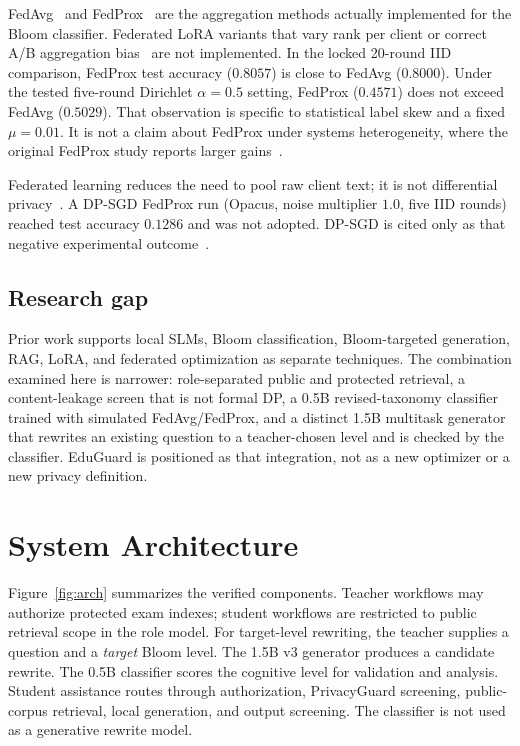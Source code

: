 \documentclass[journal]{IEEEtran}
\begin{document}
FedAvg~\cite{mcmahan2017fedavg,konecny2016comm} and FedProx~\cite{li2020fedprox} are the aggregation methods actually implemented for the Bloom classifier.
Federated LoRA variants that vary rank per client or correct A/B aggregation bias~\cite{flexlora2024,lorafair2024} are not implemented.
In the locked 20-round IID comparison, FedProx test accuracy ($0.8057$) is close to FedAvg ($0.8000$).
Under the tested five-round Dirichlet $\alpha{=}0.5$ setting, FedProx ($0.4571$) does not exceed FedAvg ($0.5029$).
That observation is specific to statistical label skew and a fixed $\mu{=}0.01$.
It is not a claim about FedProx under systems heterogeneity, where the original FedProx study reports larger gains~\cite{li2020fedprox}.

Federated learning reduces the need to pool raw client text; it is not differential privacy~\cite{mcmahan2017fedavg,alrubaie2018privacy,kairouz2021advances}.
A DP-SGD FedProx run (Opacus, noise multiplier $1.0$, five IID rounds) reached test accuracy $0.1286$ and was not adopted.
DP-SGD is cited only as that negative experimental outcome~\cite{abadi2016dpsgd}.

\subsection{Research gap}
Prior work supports local SLMs, Bloom classification, Bloom-targeted generation, RAG, LoRA, and federated optimization as separate techniques.
The combination examined here is narrower: role-separated public and protected retrieval, a content-leakage screen that is not formal DP, a 0.5B revised-taxonomy classifier trained with simulated FedAvg/FedProx, and a distinct 1.5B multitask generator that rewrites an existing question to a teacher-chosen level and is checked by the classifier.
EduGuard is positioned as that integration, not as a new optimizer or a new privacy definition.

\section{System Architecture}
Figure~\ref{fig:arch} summarizes the verified components.
Teacher workflows may authorize protected exam indexes; student workflows are restricted to public retrieval scope in the role model.
For target-level rewriting, the teacher supplies a question and a \emph{target} Bloom level.
The 1.5B v3 generator produces a candidate rewrite.
The 0.5B classifier scores the cognitive level for validation and analysis.
Student assistance routes through authorization, PrivacyGuard screening, public-corpus retrieval, local generation, and output screening.
The classifier is not used as a generative rewrite model.
\end{document}
